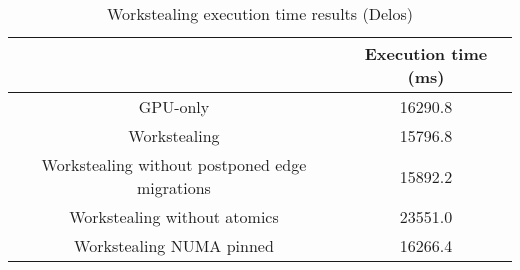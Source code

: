 \begin{table}[H]
  \centering
  \begin{tabular}{||c | c||} 
   \hline
    & Execution time (ms) \\ [0.5ex] 
   \hline\hline
   GPU-only & 16290.8 \\
   Workstealing & 15796.8 \\ 
   Workstealing without postponed edge migrations & 15892.2 \\
   Workstealing without atomics & 23551.0 \\
   Workstealing NUMA pinned & 16266.4 \\ [1ex] 
   \hline
  \end{tabular}
  \caption{Workstealing execution time results (Delos)}
  \label{table:workst_delos}
\end{table}